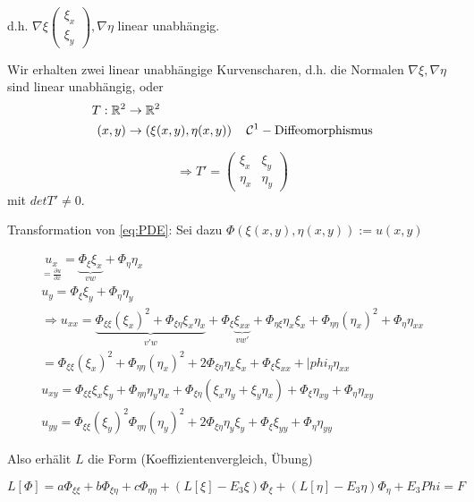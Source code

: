 d.h. $\nabla \xi \begin{pmatrix} \xi_x\\ \xi_y \end{pmatrix}, \nabla\eta$ linear unabhängig.

Wir erhalten zwei linear unabhängige Kurvenscharen, d.h. die Normalen $\nabla \xi, \nabla \eta$ sind linear unabhängig, oder 
\begin{align*}
    T:\mathbb{R}^2 &\to\mathbb{R}^2\\
    (x,y) &\to \left( \xi(x,y), \eta(x,y) \right) \quad \mathcal{C}^1-\text{Diffeomorphismus}\\
\end{align*}

\[
    \Rightarrow T' = 
    \begin{pmatrix}
        \xi_x & \xi_y \\
        \eta_x & \eta_y
    \end{pmatrix}
\]
mit $det T' \neq 0$.

Transformation von \eqref{eq:PDE}: Sei dazu $\Phi\left( \xi(x,y), \eta(x,y) \right):= u(x,y)$

\begin{align*}
    \underset{=\frac{\partial u}{\partial x}}{u_x} = \underbrace{\Phi_\xi \xi_x}_{vw} + \Phi_\eta \eta_x\\
    u_y = \Phi_\xi \xi_y + \Phi_\eta \eta_y\\
    \Rightarrow u_{xx} = \underbrace{\Phi_{\xi\xi}(\xi_x)^2 + \Phi_{\xi\eta} \xi_x\eta_x}_{v'w} + \Phi_\xi \underbrace{\xi_{xx}}_{vw'}
    + \Phi_{\eta\xi} \eta_x \xi_x + \Phi_{\eta\eta}(\eta_x)^2 + \Phi_\eta \eta_{xx}\\
    = \Phi_{\xi\xi} (\xi_x)^2 + \Phi_{\eta\eta}(\eta_x)^2 + 2\Phi_{\xi\eta} \eta_x \xi_x + \Phi_\xi \xi_{xx} + |phi_\eta \eta_{xx}\\
    u_{xy} = \Phi_{\xi\xi} \xi_x\xi_y + \Phi_{\eta\eta} \eta_y \eta_x + \Phi_{\xi\eta} (\xi_x\eta_y + \xi_y\eta_x) + \Phi_\xi \eta_{xy} + \Phi_\eta \eta_{xy}\\
    u_{yy} = \Phi_{\xi\xi}(\xi_y)^2 \Phi_{\eta\eta} (\eta_y)^2 + 2\Phi_{\xi\eta} \eta_y\xi_y + \Phi_\xi \xi_{yy} + \Phi_\eta \eta_{yy}
\end{align*} 

Also erhälit $L$ die Form (Koeffizientenvergleich, Übung)

\begin{equation} %
    L[\Phi] = a \Phi_{\xi\xi} + b\Phi_{\xi\eta} + c \Phi_{\eta\eta} + \left( L[\xi] - E_3\xi \right)\Phi_\xi + \left( L[\eta] - E_3\eta \right) \Phi_\eta + E_3 Phi = F
    \label{eq:newPDE}
\end{equation}

